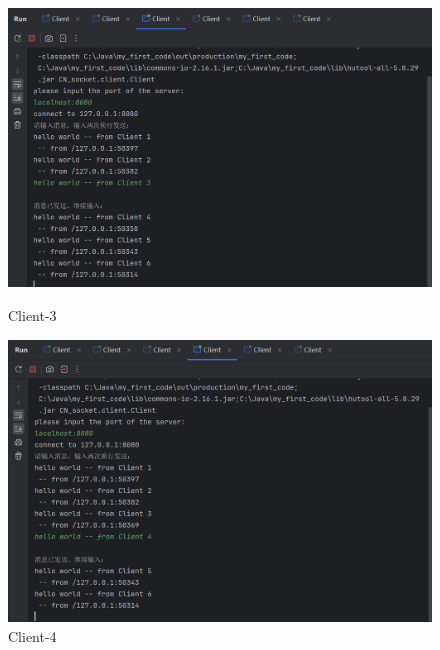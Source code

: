 \documentclass{article}
\begin{document}
	\begin{figure}[H]
		\centering
		\begin{minipage}[b]{0.45\textwidth}
			\includegraphics[width=\textwidth]{./images/2.支持5个以上客户端同时发送消息并逐一打印-Client3.png}
			\caption{Client-3}
		\end{minipage}
		\hfill
		\begin{minipage}[b]{0.45\textwidth}
			\includegraphics[width=\textwidth]{./images/2.支持5个以上客户端同时发送消息并逐一打印-Client4.png}
			\caption{Client-4}
		\end{minipage}
	\end{figure}
	
\end{document}
